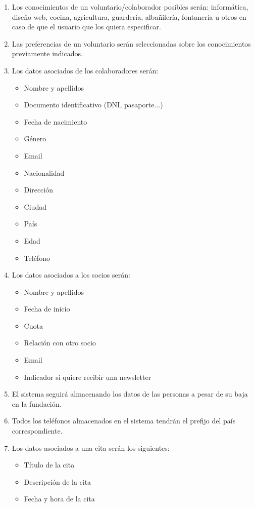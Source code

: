 \begin{enumerate}[start=6,label={RNF-\arabic*.}]
    \item Los conocimientos de un voluntario/colaborador posibles serán: informática, diseño web, cocina, agricultura, guardería, albañilería, fontanería u otros en caso de que el usuario que los quiera especificar.
    \item Las preferencias de un voluntario serán seleccionadas sobre los conocimientos previamente indicados.
    \item Los datos asociados de los colaboradores serán:
        \begin{itemize}
            \item Nombre y apellidos
            \item Documento identificativo (DNI, pasaporte...)
            \item Fecha de nacimiento
            \item Género
            \item Email
            \item Nacionalidad
            \item Dirección
            \item Ciudad
            \item País
            \item Edad
            \item Teléfono
        \end{itemize}
    \item Los datos asociados a los socios serán:
        \begin{itemize}
            \item Nombre y apellidos
            \item Fecha de inicio
            \item Cuota
            \item Relación con otro socio
            \item Email
            \item Indicador si quiere recibir una newsletter
        \end{itemize}
    \item El sistema seguirá almacenando los datos de las personas a pesar de su baja en la fundación.
    \item Todos los teléfonos almacenados en el sistema tendrán el prefijo del país correspondiente.
    \item Los datos asociados a una cita serán los siguientes:
        \begin{itemize}
            \item Título de la cita
            \item Descripción de la cita
            \item Fecha y hora de la cita
        \end{itemize}

\end{enumerate}


